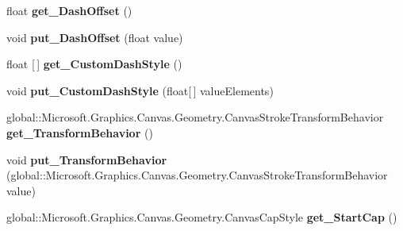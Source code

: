\begin{DoxyCompactItemize}
float {\bfseries get\+\_\+\+Dash\+Offset} ()
\item 
\mbox{\label{interface_microsoft_1_1_graphics_1_1_canvas_1_1_geometry_1_1_i_canvas_stroke_style_a470c5f115b6bf096380d61e538a59cad}} 
void {\bfseries put\+\_\+\+Dash\+Offset} (float value)
\item 
\mbox{\label{interface_microsoft_1_1_graphics_1_1_canvas_1_1_geometry_1_1_i_canvas_stroke_style_a01ec98472128934fc496593cee96dff2}} 
float \mbox{[}$\,$\mbox{]} {\bfseries get\+\_\+\+Custom\+Dash\+Style} ()
\item 
\mbox{\label{interface_microsoft_1_1_graphics_1_1_canvas_1_1_geometry_1_1_i_canvas_stroke_style_afc2f9171bd8e3a6ef7927abcbd756c59}} 
void {\bfseries put\+\_\+\+Custom\+Dash\+Style} (float\mbox{[}$\,$\mbox{]} value\+Elements)
\item 
\mbox{\label{interface_microsoft_1_1_graphics_1_1_canvas_1_1_geometry_1_1_i_canvas_stroke_style_a8c19df45244410757192563987bfbdfa}} 
global\+::\+Microsoft.\+Graphics.\+Canvas.\+Geometry.\+Canvas\+Stroke\+Transform\+Behavior {\bfseries get\+\_\+\+Transform\+Behavior} ()
\item 
\mbox{\label{interface_microsoft_1_1_graphics_1_1_canvas_1_1_geometry_1_1_i_canvas_stroke_style_ac482e23f3ef5eebc025715899d1deb51}} 
void {\bfseries put\+\_\+\+Transform\+Behavior} (global\+::\+Microsoft.\+Graphics.\+Canvas.\+Geometry.\+Canvas\+Stroke\+Transform\+Behavior value)
\item 
\mbox{\label{interface_microsoft_1_1_graphics_1_1_canvas_1_1_geometry_1_1_i_canvas_stroke_style_a23f30b5c717e10b15ce38fa7d3721e03}} 
global\+::\+Microsoft.\+Graphics.\+Canvas.\+Geometry.\+Canvas\+Cap\+Style {\bfseries get\+\_\+\+Start\+Cap} ()
\item 
\mbox{\label{interface_microsoft_1_1_graphics_1_1_canvas_1_1_geometry_1_1_i_canvas_stroke_style_a2fdd3aee781a3fb799081a2ec567b732}} 

\end{DoxyCompactItemize}

